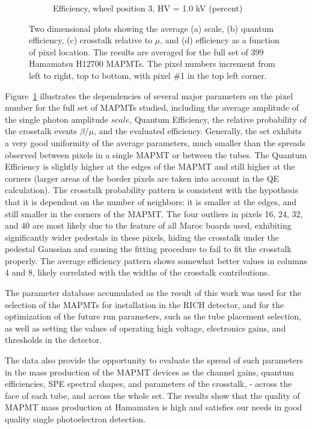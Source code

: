\begin{figure}[t!]
\begin{subfigure}[c]{0.48\linewidth}
		\caption{Efficiency, wheel position 3, HV = 1.0 kV (percent)}
		\vspace{0mm}
	\end{subfigure}%
	\caption{Two dimensional plots showing the average (a) scale, (b) quantum efficiency, (c) crosstalk relative to $\mu$, and (d) efficiency as a function of pixel location. The results are averaged for the full set of 399 Hamamatsu H12700 MAPMTs. The pixel numbers increment from left to right, top to bottom, with pixel \#1 in the top left corner.}
	\label{fig:2d_avg_fit_results}
\end{figure}


Figure~\ref{fig:2d_avg_fit_results} illustrates the dependencies of several major parameters on the pixel number for the full set of MAPMTs studied, including the average amplitude of the single photon amplitude $scale$, Quantum Efficiency, the relative probability of the crosstalk events $\beta/\mu$, and the evaluated efficiency. Generally, the set exhibits a very good uniformity of the average parameters, much smaller than the spreads observed between pixels in a single MAPMT or between the tubes. The Quantum Efficiency is slightly higher at the edges of the MAPMT and still higher at the corners (larger areas of the border pixels are taken into account in the QE calculation). The crosstalk probability pattern is consistent with the hypothesis that it is dependent on the number of neighbors: it is smaller at the edges, and still smaller in the corners of the MAPMT. The four outliers in pixels 16, 24, 32, and 40 are most likely due to the feature of all Maroc boards used, exhibiting significantly wider pedestals in these pixels, hiding the crosstalk under the pedestal Gaussian and causing the fitting procedure to fail to fit the crosstalk properly. The average efficiency pattern shows somewhat better values in columns 4 and 8, likely correlated with the widths of the crosstalk contributions.    



The parameter database accumulated as the result of this work was used for the selection of the MAPMTs for installation in the RICH detector, and for the optimization of the future run parameters, such as the tube placement selection, as well as setting the values of operating high voltage, electronics gains, and thresholds in the detector.


The data also provide the opportunity to evaluate the spread of such parameters in the mass production of the MAPMT devices as the channel gains, quantum efficiencies, SPE spectral shapes, and parameters of the crosstalk, - across the face of each tube, and across the whole set. The results show that the quality of MAPMT mass production at Hamamatsu is high and satisfies our needs in good quality single photoelectron detection.



